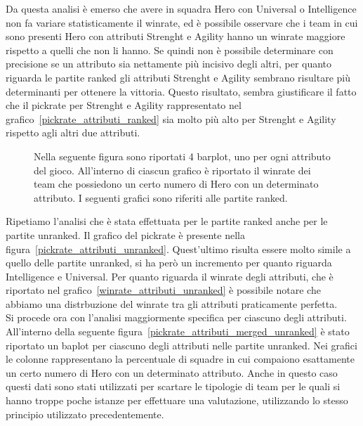 Da questa analisi è emerso che avere in squadra Hero con Universal o Intelligence non fa variare statisticamente il winrate, ed è possibile osservare che i team in cui sono presenti Hero con attributi Strenght e Agility hanno un winrate maggiore rispetto a quelli che non li hanno. Se quindi non è possibile determinare con precisione se un attributo sia nettamente più incisivo degli altri, per quanto riguarda le partite ranked gli attributi Strenght e Agility sembrano risultare più determinanti per ottenere la vittoria. Questo risultato, sembra giustificare il fatto che il pickrate per Strenght e Agility rappresentato nel grafico~\ref{pickrate_attributi_ranked} sia molto più alto per Strenght e Agility rispetto agli altri due attributi. \\
\begin{figure}[htbp]
\begin{center}

\caption{Nella seguente figura sono riportati 4 barplot, uno per ogni attributo del gioco. All'interno di ciascun grafico è riportato il winrate dei team che possiedono un certo numero di Hero con un determinato attributo. I seguenti grafici sono riferiti alle partite ranked.}
\label{winrate_attributi_merged}
\end{center}
\end{figure}
Ripetiamo l'analisi che è stata effettuata per le partite ranked anche per le partite unranked. Il grafico del pickrate è presente nella figura~\ref{pickrate_attributi_unranked}. Quest'ultimo risulta essere molto simile a quello delle partite unranked, si ha però un incremento per quanto riguarda  Intelligence e Universal. Per quanto riguarda il winrate degli attributi, che è riportato nel grafico~\ref{winrate_attributi_unranked} è possibile notare che abbiamo una distrbuzione del winrate tra gli attributi praticamente perfetta. \\
Si procede ora con l'analisi maggiormente specifica per ciascuno degli attributi. All'interno della seguente figura~\ref{pickrate_attributi_merged_unranked} è stato riportato un baplot per ciascuno degli attributi nelle partite unranked. Nei grafici le colonne rappresentano la percentuale di squadre in cui compaiono esattamente un certo numero di Hero con un determinato attributo. Anche in questo caso questi dati sono stati utilizzati per scartare le tipologie di team per le quali si hanno troppe poche istanze per effettuare una valutazione, utilizzando lo stesso principio utilizzato precedentemente. \\ 
